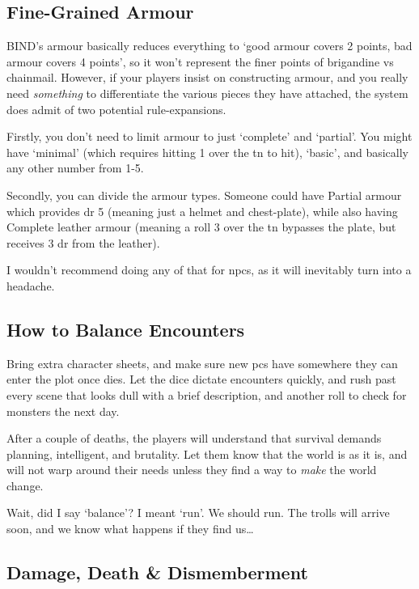\begin{multicols}{2}
\subsection{Fine-Grained Armour}

BIND's armour basically reduces everything to `good armour covers 2 points, bad armour covers 4 points', so it won't represent the finer points of brigandine vs chainmail.
However, if your players insist on constructing armour, and you really need \emph{something} to differentiate the various pieces they have attached, the system does admit of two potential rule-expansions.

Firstly, you don't need to limit armour to just `complete' and `partial'.
You might have `minimal' (which requires hitting 1 over the \gls{tn} to hit), `basic', and basically any other number from 1-5.

Secondly, you can divide the armour types.
Someone could have Partial armour which provides \gls{dr} 5 (meaning just a helmet and chest-plate), while also having Complete leather armour (meaning a roll 3 over the \gls{tn} bypasses the plate, but receives 3 \gls{dr} from the leather).

I wouldn't recommend doing any of that for \glspl{npc}, as it will inevitably turn into a headache.

\subsection{How to Balance Encounters}

Bring extra character sheets, and make sure new \glspl{pc} have somewhere they can enter the plot once  dies.
Let the dice dictate encounters quickly, and rush past every scene that looks dull with a brief description, and another roll to check for monsters the next day.

After a couple of deaths, the players will understand that survival demands planning, intelligent, and brutality.
Let them know that the world is as it is, and will not warp around their needs unless they find a way to \emph{make} the world change.

Wait, did I say `balance'?
I meant `run'.
We should run.
The trolls will arrive soon, and we know what happens if they find us\ldots

\subsection{Damage, Death \& Dismemberment}


\end{multicols}
